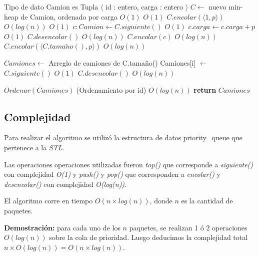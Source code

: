 \documentclass[a4paper, 10pt, twoside]{article}
\newenvironment{pseudo}[1][]{%
    \vspace{0.5em}%
    \begin{algorithmic}%
}
{%
    \end{algorithmic}%
    \vspace{0.5em}%
}
\newcommand{\In}{\textbf{in} }
\newcommand{\Ode}[1]{\hfill $O(#1)$}
\begin{document}
\begin{pseudo}
	\State Tipo de dato Camion es Tupla $\langle$ id : entero, carga : entero  $\rangle$
        \State $C \leftarrow$ nuevo min-heap de Camion, ordenado por carga   \Ode{1}
        \ForAll{$p$ \In $\langle p_1, \ldots, p_n \rangle$}    	
                                     \Ode{1}
                \State $C.encolar(\langle 1 , p \rangle)$       \Ode{log(n)}
                              \Ode{1}
                \State $c : Camion \leftarrow C.siguiente()$   \Ode{1}
                \State $c.carga \leftarrow c.carga + p$			\Ode{1}
                \State $C.desencolar()$                         \Ode{log(n)}
                \State $C.encolar(c)$                           \Ode{log(n)}
            \Else
                \State $C.encolar(\langle C.tama\tilde{n}o(), p \rangle)$ \Ode{log(n)}
            \EndIf
        \EndFor

  		\State $Camiones \leftarrow$ Arreglo de camiones de C.tamaño()
        \ForAll{$i$ \In $\langle 1, \ldots,$ C.tamaño() $\rangle$}			
      		\State Camiones[i] $\leftarrow$ $C.siguiente()$		\Ode{1}
      		\State $C.desencolar()$								\Ode{log(n)}
        \EndFor
        
        \State $Ordenar(Camiones)$ (Ordenamiento por id)		\Ode{log(n)}
        \State \textbf{return} $Camiones$
    \EndProcedure
\end{pseudo}


\subsection{Complejidad}

Para realizar el algoritmo se utilizó la estructura de datos priority\_queue que pertenece a la \textit{STL}.

Las operaciones operaciones utilizadas fueron \textit{top()} que corresponde a \textit{siguiente()} con complejidad \textit{O(1)} y \textit{push()} y \textit{pop()} que corresponden a \textit{encolar()} y \textit{desencolar()} con complejidad \textit{O(log(n))}.

El algoritmo corre en tiempo $O(n \times log(n))$, donde $n$ es la cantidad de paquetes.

\textbf{Demostración:} para cada uno de los $n$ paquetes, se realizan 1 ó 2 operaciones $O(log(n))$ sobre la cola de prioridad. Luego deducimos la complejidad total $n \times O(log(n)) = O(n \times log(n))$.
\end{document}
